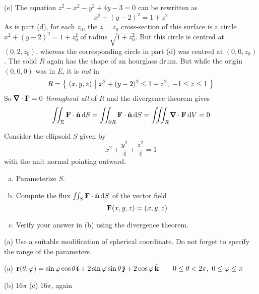 \begin{solution}
\noindent (e) 
The equation $z^2 - x^2 - y^2 + 4y - 3 = 0$ can be rewritten as
\begin{equation*}
x^2 + (y-2)^2 = 1+z^2
\end{equation*}
As is part (d), for each $z_0$, the
$z=z_0$ cross-section of this surface is a circle $x^2+(y-2)^2=1+z_0^2$
of radius $\sqrt{1+z_0^2}$. But this circle is centred at
$(0,2,z_0)$, whereas the corresponding circle in part (d) was centred at
$(0,0,z_0)$. The solid $R$ again has the shape of an hourglass drum.
But while the origin $(0,0,0)$ was in $E$, it is \emph{not} in
\begin{equation*}
R=\big\{ \ (x,y,z)\ \big|\ x^2+(y-2)^2\le 1+z^2,\ -1\le z\le 1\ \big\}
\end{equation*}
So $\vnabla \cdot \vF=0$ \emph{throughout all} of $R$ and the
divergence theorem gives
\begin{align*}
\dblInt_{\Sigma} \vF\cdot\hn\,\dee{S}
=\dblInt_{\partial R} \vF\cdot\hn\,\dee{S}
=\tripInt_{R} \vnabla \cdot \vF\,\dee{V}
=0
\end{align*}
\end{solution}

\begin{question}[M317 2009A] %
Consider the ellipsoid $S$ given by
\begin{equation*}
x^2 + \frac{y^2}{4} +\frac{z^2}{4} = 1
\end{equation*}
with the unit normal pointing outward.

\begin{enumerate}[(a)]
\item
Parameterize $S$.
\item
Compute the flux $\iint_S \mathbf{F}\cdot\hat{\mathbf{n}}\, \mathrm{d}S$ of the vector field
\begin{equation*}
\mathbf{F}(x,y,z) = (x, y, z)
\end{equation*}
\item
Verify your answer in (b) using the divergence theorem.
\end{enumerate}
\end{question}

\begin{hint} 
(a) Use a suitable modification of spherical coordinate. 
Do not forget to specify the range of the parameters.
\end{hint}

\begin{answer} 
(a) $\mathbf{r}(\theta,\varphi)
=\sin\varphi\cos\theta\,\hat{\pmb{\imath}}
  +2\sin\varphi\sin\theta\,\hat{\pmb{\jmath}}
  +2\cos\varphi\,\hat{\mathbf{k}}\qquad
0\le\theta<2\pi,\ 0\le \varphi \le \pi$

(b) $16\pi$\qquad
(c) $16\pi$, again

\end{answer}

